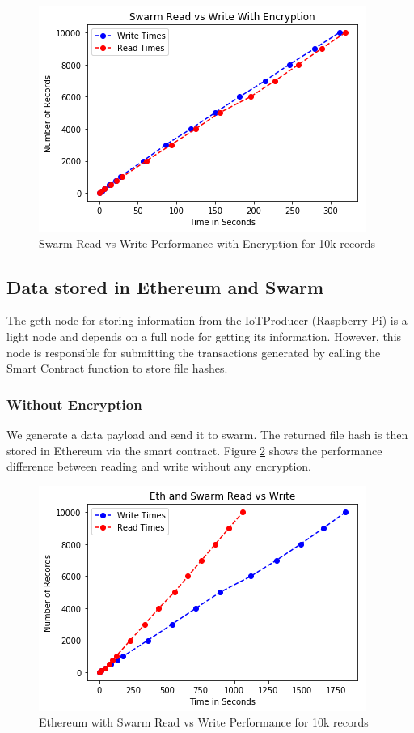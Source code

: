 \documentclass[11pt,openright]{report}
\begin{document}
\begin{figure}
    \centering
    \includegraphics[scale=1]{results/graphs/Swarm_Read_v_Write_Encr.png}
    \caption{Swarm Read vs Write Performance with Encryption for 10k records}
    \label{fig:graph_swarm_readvwrite_encr}
\end{figure}

\subsection{Data stored in Ethereum and Swarm}
The geth node for storing information from the IoTProducer (Raspberry Pi) is a light node and depends on a full node for getting its information. However, this node is responsible for submitting the transactions generated by calling the Smart Contract function to store file hashes.

\subsubsection{Without Encryption}
We generate a data payload and send it to swarm. The returned file hash is then stored in Ethereum via the smart contract. Figure \ref{fig:graph_eth_swarm_readvwrite} shows the performance difference between reading and write without any encryption.

\begin{figure}
    \centering
    \includegraphics[scale=1]{results/graphs/Eth_Swarm_Read_v_Write.png}
    \caption{Ethereum with Swarm Read vs Write Performance for 10k records}
    \label{fig:graph_eth_swarm_readvwrite}
\end{figure}
\end{document}
